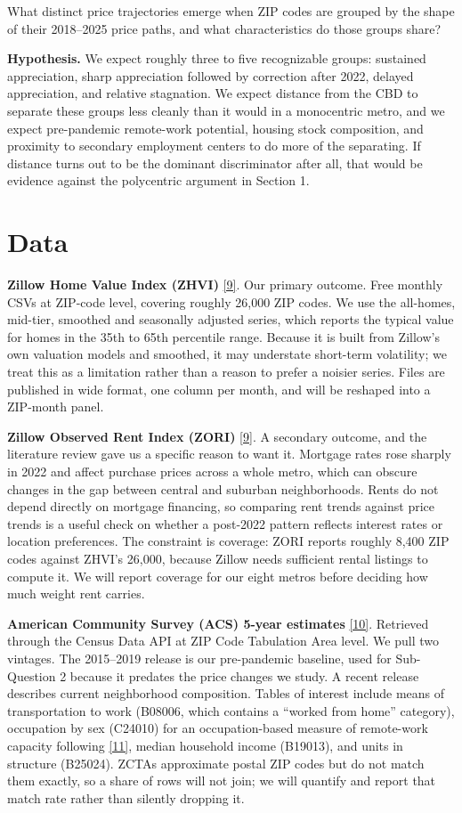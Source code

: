 \documentclass[11pt]{article}
\newcommand{\refl}[2]{\href{#2}{[#1]}}
\newcommand{\uZillow}{https://www.zillow.com/research/data/}
\newcommand{\uAcs}{https://www.census.gov/data/developers/data-sets/acs-5year.html}
\newcommand{\uDingel}{https://doi.org/10.1016/j.jpubeco.2020.104235}
\begin{document}
What distinct price trajectories emerge when ZIP codes are grouped by the shape
of their 2018--2025 price paths, and what characteristics do those groups share?

\textbf{Hypothesis.} We expect roughly three to five recognizable groups:
sustained appreciation, sharp appreciation followed by correction after 2022,
delayed appreciation, and relative stagnation. We expect distance from the CBD to
separate these groups less cleanly than it would in a monocentric metro, and we
expect pre-pandemic remote-work potential, housing stock composition, and
proximity to secondary employment centers to do more of the separating. If
distance turns out to be the dominant discriminator after all, that would be
evidence against the polycentric argument in Section 1.

\section{Data}

\textbf{Zillow Home Value Index (ZHVI)} \refl{9}{\uZillow}. Our primary outcome.
Free monthly CSVs at ZIP-code level, covering roughly 26{,}000 ZIP codes. We use
the all-homes, mid-tier, smoothed and seasonally adjusted series, which reports
the typical value for homes in the 35th to 65th percentile range. Because it is
built from Zillow's own valuation models and smoothed, it may understate
short-term volatility; we treat this as a limitation rather than a reason to
prefer a noisier series. Files are published in wide format, one column per
month, and will be reshaped into a ZIP-month panel.

\textbf{Zillow Observed Rent Index (ZORI)} \refl{9}{\uZillow}. A secondary
outcome, and the literature review gave us a specific reason to want it. Mortgage
rates rose sharply in 2022 and affect purchase prices across a whole metro, which
can obscure changes in the gap between central and suburban neighborhoods. Rents
do not depend directly on mortgage financing, so comparing rent trends against
price trends is a useful check on whether a post-2022 pattern reflects interest
rates or location preferences. The constraint is coverage: ZORI reports roughly
8{,}400 ZIP codes against ZHVI's 26{,}000, because Zillow needs sufficient rental
listings to compute it. We will report coverage for our eight metros before
deciding how much weight rent carries.

\textbf{American Community Survey (ACS) 5-year estimates} \refl{10}{\uAcs}.
Retrieved through the Census Data API at ZIP Code Tabulation Area level. We pull
two vintages. The 2015--2019 release is our pre-pandemic baseline, used for
Sub-Question 2 because it predates the price changes we study. A recent release
describes current neighborhood composition. Tables of interest include means of
transportation to work (B08006, which contains a ``worked from home'' category),
occupation by sex (C24010) for an occupation-based measure of remote-work
capacity following \refl{11}{\uDingel}, median household income (B19013), and
units in structure (B25024). ZCTAs approximate postal ZIP codes but do not match
them exactly, so a share of rows will not join; we will quantify and report that
match rate rather than silently dropping it.
\end{document}
